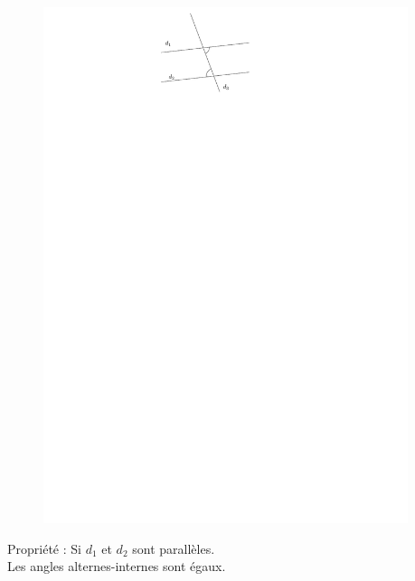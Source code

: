\documentclass{beamer}
\begin{document}
\begin{frame}
\begin{columns}[t]
\begin{column}{5cm}
    \end{column}
    \begin{column}{5cm}
      \begin{figure}[H]
        \centering
        \includegraphics[width=0.6\linewidth]{5x10-angles/sources/ai-2.pdf}
      \end{figure}
      \begin{block}{Propriété :}	
        Si $d_1$ et $d_2$ sont \alert{parallèles}.\\
        Les angles alternes-internes sont \alert{égaux}.
      \end{block}   
    \end{column}
  \end{columns}    
\end{frame}
\end{document}
